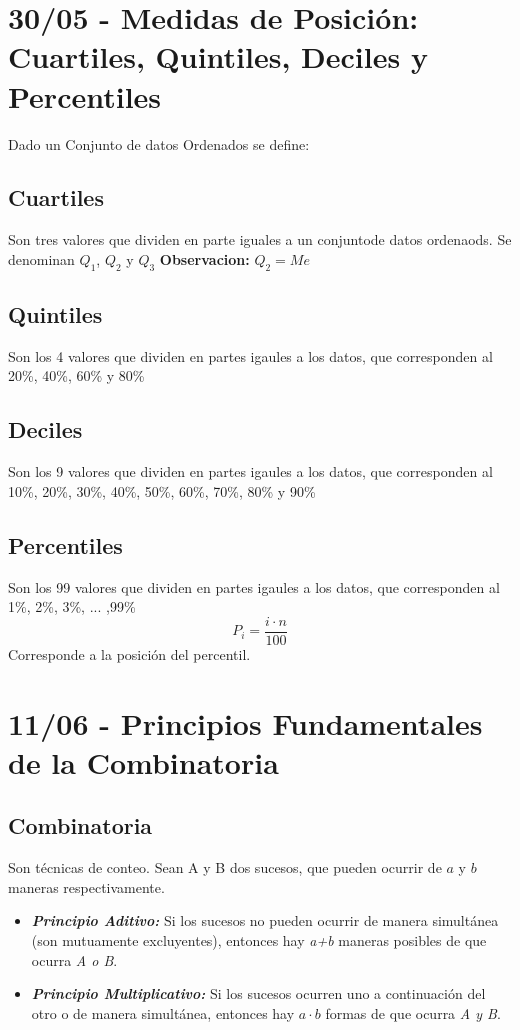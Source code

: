 \documentclass[12pt, letterpaper]{article}
\begin{document}
\section{30/05 - Medidas de Posición: Cuartiles, Quintiles, Deciles y Percentiles}
Dado un Conjunto de datos Ordenados se define:

\subsection{Cuartiles}
Son tres valores que dividen en parte iguales a un conjuntode datos ordenaods. Se denominan $Q_1$, $Q_2$ y $Q_3$
\textbf{Observacion:} $Q_2 = Me$

\subsection{Quintiles}
Son los 4 valores que dividen en partes igaules a los datos, que corresponden al 20\%, 40\%, 60\% y 80\%

\subsection{Deciles}
Son los 9 valores que dividen en partes igaules a los datos, que corresponden al 10\%, 20\%, 30\%, 40\%, 50\%, 60\%, 70\%, 80\% y 90\%


\subsection{Percentiles}
Son los 99 valores que dividen en partes igaules a los datos, que corresponden al 1\%, 2\%, 3\%, ... ,99\%
\[ P_i= \frac{i \cdot n}{100} \] Corresponde a la posición del percentil.


\newpage

\section{11/06 - Principios Fundamentales de la Combinatoria}
\subsection{Combinatoria}
Son técnicas de conteo. Sean A y B dos sucesos, que pueden ocurrir de $a$ y $b$ maneras respectivamente.
\begin{itemize}
	\item \textbf{\textit{Principio Aditivo:}} Si los sucesos no pueden ocurrir de manera simultánea (son mutuamente excluyentes), entonces hay \textit{a+b} maneras posibles de que ocurra \textit{A o B}.
	\item \textbf{\textit{Principio Multiplicativo:}} Si los sucesos ocurren uno a continuación del otro o de manera simultánea, entonces hay $a \cdot b$ formas de que ocurra \textit{A y B}.
\end{itemize}
\end{document}
